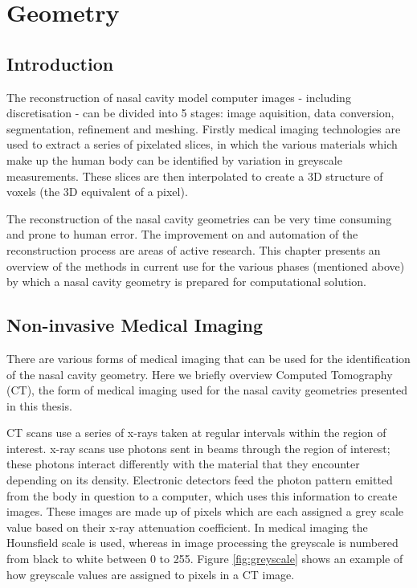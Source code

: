 \section{Geometry}
\subsection{Introduction}

The reconstruction of nasal cavity model computer images - including discretisation - can be divided into 5 stages: image aquisition, data conversion, segmentation, refinement and meshing. Firstly medical imaging technologies are used to extract a series of pixelated slices, in which the various materials which make up the human body can be identified by variation in greyscale measurements. These slices are then interpolated to create a 3D structure of voxels (the 3D equivalent of a pixel).

The reconstruction of the nasal cavity geometries can be very time consuming and prone to human error. The improvement on and automation of the reconstruction process are areas of active research. This chapter presents an overview of the methods in current use for the various phases (mentioned above) by which a nasal cavity geometry is prepared for computational solution.

\subsection{Non-invasive Medical Imaging}

There are various forms of medical imaging that can be used for the identification of the nasal cavity geometry. Here we briefly overview Computed Tomography (CT), the form of medical imaging used for the nasal cavity geometries presented in this thesis.

CT scans use a series of x-rays taken at regular intervals within the region of interest. x-ray scans use photons sent in beams through the region of interest; these photons interact differently with the material that they encounter depending on its density. Electronic detectors feed the photon pattern emitted from the body in question to a computer, which uses this information to create images. These images are made up of pixels which are each assigned a grey scale value based on their x-ray attenuation coefficient. In medical imaging the Hounsfield scale is used, whereas in image processing the greyscale is numbered from black to white between 0 to 255. Figure \ref{fig:greyscale} shows an  example of how greyscale values are assigned to pixels in a CT image.

